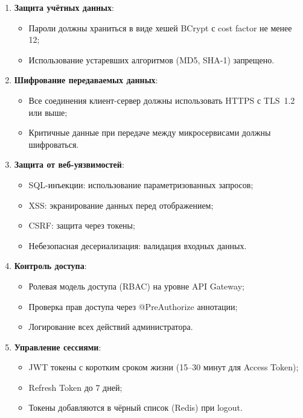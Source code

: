 \documentclass{bmstu}
\begin{document}
\begin{enumerate}
    \item \textbf{Защита учётных данных}:
    \begin{itemize}
        \item Пароли должны храниться в виде хешей BCrypt с cost factor не менее 12;
        \item Использование устаревших алгоритмов (MD5, SHA-1) запрещено.
    \end{itemize}
    
    \item \textbf{Шифрование передаваемых данных}:
    \begin{itemize}
        \item Все соединения клиент-сервер должны использовать HTTPS с TLS~1.2 или выше;
        \item Критичные данные при передаче между микросервисами должны шифроваться.
    \end{itemize}
    
    \item \textbf{Защита от веб-уязвимостей}:
    \begin{itemize}
        \item SQL-инъекции: использование параметризованных запросов;
        \item XSS: экранирование данных перед отображением;
        \item CSRF: защита через токены;
        \item Небезопасная десериализация: валидация входных данных.
    \end{itemize}
    
    \item \textbf{Контроль доступа}:
    \begin{itemize}
        \item Ролевая модель доступа (RBAC) на уровне API Gateway;
        \item Проверка прав доступа через @PreAuthorize аннотации;
        \item Логирование всех действий администратора.
    \end{itemize}
    
    \item \textbf{Управление сессиями}:
    \begin{itemize}
        \item JWT токены с коротким сроком жизни (15--30 минут для Access Token);
        \item Refresh Token до 7 дней;
        \item Токены добавляются в чёрный список (Redis) при logout.
    \end{itemize}
    

\end{enumerate}
\end{document}
